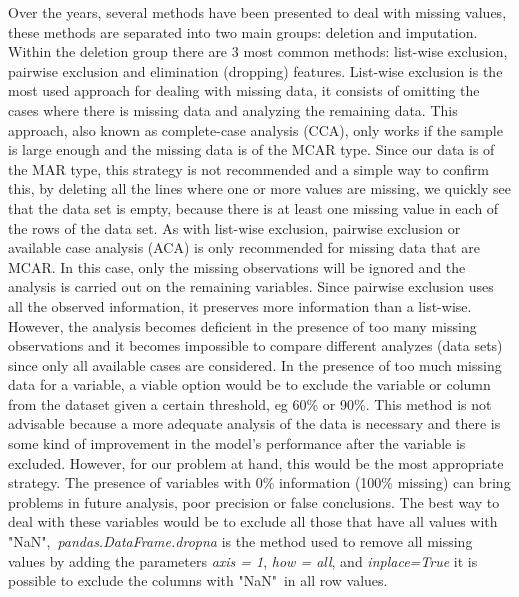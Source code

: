 Over the years, several methods have been presented to deal with missing values, these methods are separated into two main groups: deletion and imputation. Within the deletion group there are 3 most common methods: list-wise exclusion, pairwise exclusion and elimination (dropping) features. List-wise exclusion is the most used approach for dealing with missing data, it consists of omitting the cases where there is missing data and analyzing the remaining data. This approach, also known as complete-case analysis (CCA), only works if the sample is large enough and the missing data is of the MCAR type. Since our data is of the MAR type, this strategy is not recommended and a simple way to confirm this, by deleting all the lines where one or more values are missing, we quickly see that the data set is empty, because there is at least one missing value in each of the rows of the data set. As with list-wise exclusion, pairwise exclusion or available case analysis (ACA) is only recommended for missing data that are MCAR. In this case, only the missing observations will be ignored and the analysis is carried out on the remaining variables. Since pairwise exclusion uses all the observed information, it preserves more information than a list-wise. However, the analysis becomes deficient in the presence of too many missing observations and it becomes impossible to compare different analyzes (data sets) since only all available cases are considered. In the presence of too much missing data for a variable, a viable option would be to exclude the variable or column from the dataset given a certain threshold, eg 60\% or 90\%. This method is not advisable because a more adequate analysis of the data is necessary and there is some kind of improvement in the model's performance after the variable is excluded. However, for our problem at hand, this would be the most appropriate strategy. The presence of variables with 0\% information (100\% missing) can bring problems in future analysis, poor precision or false conclusions. The best way to deal with these variables would be to exclude all those that have all values with "NaN",\ \textit{pandas.DataFrame.dropna} is the method used to remove all missing values by adding the parameters \textit{axis = 1}, \textit{how = all}, and \textit{inplace=True} it is possible to exclude the columns with "NaN"\ in all row values.

